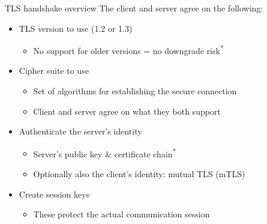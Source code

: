 \begin{frame}{TLS handshake overview}
  The client and server agree on the following:
  \begin{itemize}[<+(1)->]
    \item TLS version to use (1.2 or 1.3)
    \begin{itemize}
      \item No support for older versions = no downgrade risk\textsuperscript{*}
    \end{itemize}
    \item Cipher suite to use
    \begin{itemize}
      \item Set of algorithms for establishing the secure connection
      \item Client and server agree on what they both support
    \end{itemize}
    \item Authenticate the server's identity
    \begin{itemize}
      \item Server's public key \& certificate chain\textsuperscript{*}
      \item Optionally also the client's identity: mutual TLS (mTLS)
    \end{itemize}
    \item Create session keys
    \begin{itemize}
      \item These protect the actual communication session
    \end{itemize}
  \end{itemize}
\end{frame}

